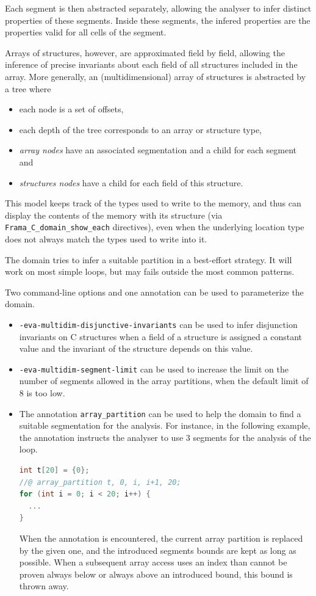 \documentclass[web]{frama-c-book}
\begin{document}
Each segment is then abstracted separately, allowing the analyser to infer
distinct properties of these segments. Inside these segments, the infered
properties are the properties valid for all cells of the segment.

Arrays of structures, however, are approximated field by field, allowing the
inference of precise invariants about each field of all structures included in
the array. More generally, an (multidimensional) array of structures is
abstracted by a tree where
\begin{itemize}
  \item each node is a set of offsets,
  \item each depth of the tree corresponds to an array or structure type,
  \item {\it array nodes} have an associated segmentation and a child for
        each segment and
  \item {\it structures nodes} have a child for each field of this structure.
\end{itemize}

This model keeps track of the types used to write to the memory, and thus
can display the contents of the memory with its structure (via
\lstinline|Frama_C_domain_show_each| directives), even when the underlying
location type does not always match the types used to write into it.

The domain tries to infer a suitable partition in a best-effort strategy. It
will work on most simple loops, but may fails outside the most common patterns.

Two command-line options and one annotation can be used to parameterize the
domain.
\begin{itemize}
  \item {\tt -eva-multidim-disjunctive-invariants} can be used to infer
        disjunction invariants on C structures when a field of a structure is
        assigned a constant value and the invariant of the structure depends on
        this value.
  \item {\tt -eva-multidim-segment-limit} can be used to increase the limit on
        the number of segments allowed in the array partitions, when the default
        limit of 8 is too low.
  \item The annotation {\tt array\_partition} can be used to help the domain
        to find a suitable segmentation for the analysis. For instance, in
        the following example, the annotation instructs the analyser to use
        3 segments for the analysis of the loop.
\begin{lstlisting}[language=C]
int t[20] = {0};
//@ array_partition t, 0, i, i+1, 20;
for (int i = 0; i < 20; i++) {
  ...
}
\end{lstlisting}
        When the annotation is encountered, the current array partition is
        replaced by the given one, and the introduced segments bounds are kept
        as long as possible. When a subsequent array access uses an index than
        cannot be proven always below or always above an introduced bound, this
        bound is thrown away.
\end{itemize}
\end{document}
